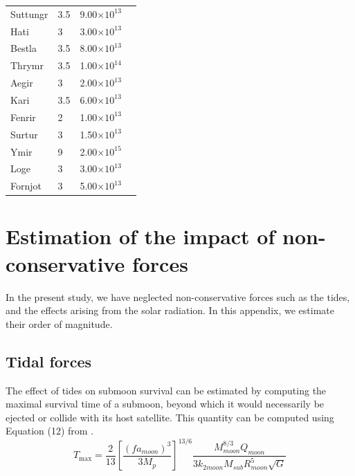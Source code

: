 \documentclass{aa}
\begin{document}
\begin{appendix}
\begin{table}[!ht]
\begin{tabular}{llll}
        Suttungr & 3.5 & 9.00$\times10^{13 }$ & \cite{Denk_OuterMoonsSaturn} \\ 
        Hati & 3 & 3.00$\times10^{13 }$ & \cite{Denk_OuterMoonsSaturn} \\ 
        Bestla & 3.5 & 8.00$\times10^{13 }$ & \cite{Denk_OuterMoonsSaturn} \\ 
        Thrymr & 3.5 & 1.00$\times10^{14 }$ & \cite{Denk_OuterMoonsSaturn} \\ 
        Aegir & 3 & 2.00$\times10^{13 }$ & \cite{Denk_OuterMoonsSaturn} \\ 
        Kari & 3.5 & 6.00$\times10^{13 }$ & \cite{Denk_OuterMoonsSaturn} \\ 
        Fenrir & 2 & 1.00$\times10^{13 }$ & \cite{Denk_OuterMoonsSaturn} \\ 
        Surtur & 3 & 1.50$\times10^{13 }$ & \cite{Denk_OuterMoonsSaturn} \\ 
        Ymir & 9 & 2.00$\times10^{15 }$ & \cite{Denk_OuterMoonsSaturn} \\ 
        Loge & 3 & 3.00$\times10^{13 }$ & \cite{Denk_OuterMoonsSaturn} \\ 
        Fornjot & 3 & 5.00$\times10^{13 }$ & \cite{Denk_OuterMoonsSaturn} \\ \hline
    \end{tabular}
\end{table}
\clearpage

\section{Estimation of the impact of non-conservative forces}\label{app:nonconservative}
In the present study, we have neglected non-conservative forces such as the tides, and the effects arising from the solar radiation. In this appendix, we estimate their order of magnitude.
\subsection{Tidal forces}
The effect of tides on submoon survival can be estimated by computing the maximal survival time of a submoon, beyond which it would necessarily be ejected or collide with its host satellite. This quantity can be computed using Equation (12) from \cite{Barnes_2002}. 
\begin{equation}
    T_{\max }=\frac{2}{13}\left[\frac{\left(f a_{moon}\right)^3}{3 M_p}\right]^{13 / 6} \frac{M_{moon}^{8 / 3} Q_{moon}}{3 k_{2 moon} M_{sub} R_{moon}^5 \sqrt{G}}
\end{equation}


\end{appendix}
\end{document}
